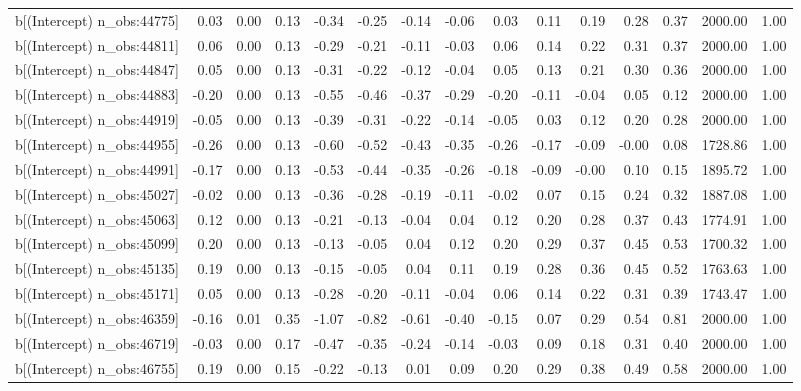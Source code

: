 \begin{table}[ht]
\begin{tabular}{rrrrrrrrrrrrrrr}
  b[(Intercept) n\_obs:44775] & 0.03 & 0.00 & 0.13 & -0.34 & -0.25 & -0.14 & -0.06 & 0.03 & 0.11 & 0.19 & 0.28 & 0.37 & 2000.00 & 1.00 \\ 
  b[(Intercept) n\_obs:44811] & 0.06 & 0.00 & 0.13 & -0.29 & -0.21 & -0.11 & -0.03 & 0.06 & 0.14 & 0.22 & 0.31 & 0.37 & 2000.00 & 1.00 \\ 
  b[(Intercept) n\_obs:44847] & 0.05 & 0.00 & 0.13 & -0.31 & -0.22 & -0.12 & -0.04 & 0.05 & 0.13 & 0.21 & 0.30 & 0.36 & 2000.00 & 1.00 \\ 
  b[(Intercept) n\_obs:44883] & -0.20 & 0.00 & 0.13 & -0.55 & -0.46 & -0.37 & -0.29 & -0.20 & -0.11 & -0.04 & 0.05 & 0.12 & 2000.00 & 1.00 \\ 
  b[(Intercept) n\_obs:44919] & -0.05 & 0.00 & 0.13 & -0.39 & -0.31 & -0.22 & -0.14 & -0.05 & 0.03 & 0.12 & 0.20 & 0.28 & 2000.00 & 1.00 \\ 
  b[(Intercept) n\_obs:44955] & -0.26 & 0.00 & 0.13 & -0.60 & -0.52 & -0.43 & -0.35 & -0.26 & -0.17 & -0.09 & -0.00 & 0.08 & 1728.86 & 1.00 \\ 
  b[(Intercept) n\_obs:44991] & -0.17 & 0.00 & 0.13 & -0.53 & -0.44 & -0.35 & -0.26 & -0.18 & -0.09 & -0.00 & 0.10 & 0.15 & 1895.72 & 1.00 \\ 
  b[(Intercept) n\_obs:45027] & -0.02 & 0.00 & 0.13 & -0.36 & -0.28 & -0.19 & -0.11 & -0.02 & 0.07 & 0.15 & 0.24 & 0.32 & 1887.08 & 1.00 \\ 
  b[(Intercept) n\_obs:45063] & 0.12 & 0.00 & 0.13 & -0.21 & -0.13 & -0.04 & 0.04 & 0.12 & 0.20 & 0.28 & 0.37 & 0.43 & 1774.91 & 1.00 \\ 
  b[(Intercept) n\_obs:45099] & 0.20 & 0.00 & 0.13 & -0.13 & -0.05 & 0.04 & 0.12 & 0.20 & 0.29 & 0.37 & 0.45 & 0.53 & 1700.32 & 1.00 \\ 
  b[(Intercept) n\_obs:45135] & 0.19 & 0.00 & 0.13 & -0.15 & -0.05 & 0.04 & 0.11 & 0.19 & 0.28 & 0.36 & 0.45 & 0.52 & 1763.63 & 1.00 \\ 
  b[(Intercept) n\_obs:45171] & 0.05 & 0.00 & 0.13 & -0.28 & -0.20 & -0.11 & -0.04 & 0.06 & 0.14 & 0.22 & 0.31 & 0.39 & 1743.47 & 1.00 \\ 
  b[(Intercept) n\_obs:46359] & -0.16 & 0.01 & 0.35 & -1.07 & -0.82 & -0.61 & -0.40 & -0.15 & 0.07 & 0.29 & 0.54 & 0.81 & 2000.00 & 1.00 \\ 
  b[(Intercept) n\_obs:46719] & -0.03 & 0.00 & 0.17 & -0.47 & -0.35 & -0.24 & -0.14 & -0.03 & 0.09 & 0.18 & 0.31 & 0.40 & 2000.00 & 1.00 \\ 
  b[(Intercept) n\_obs:46755] & 0.19 & 0.00 & 0.15 & -0.22 & -0.13 & 0.01 & 0.09 & 0.20 & 0.29 & 0.38 & 0.49 & 0.58 & 2000.00 & 1.00 \\ 

\end{tabular}
\end{table}
